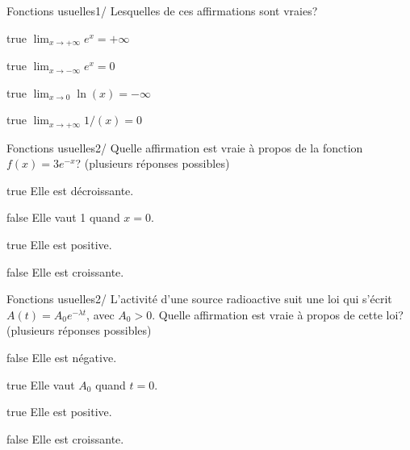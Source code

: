         	\begin{question}{30}{Fonctions usuelles}{1}{/}
				Lesquelles de ces affirmations sont vraies?
            \end{question}
            \begin{reponses}
            	\item[true] $\lim_{x\to +\infty} e^x = +\infty$
            	\item[true] $\lim_{x\to -\infty} e^x = 0$
                \item[true] $\lim_{x\to 0} \ln (x) = -\infty$
                \item[true] $\lim_{x\to +\infty} 1/(x) = 0$
            \end{reponses}
            \begin{question}{30}{Fonctions usuelles}{2}{/}
                Quelle affirmation est vraie à propos de la fonction $f(x)=3e^{-x}$? (plusieurs réponses possibles)
            \end{question}
            \begin{reponses}
                \item[true] Elle est décroissante.
                \item[false] Elle vaut 1 quand $x=0$.
                \item[true] Elle est positive.
                \item[false] Elle est croissante.
            \end{reponses}
            \begin{question}{30}{Fonctions usuelles}{2}{/}
                L'activité d'une source radioactive suit une loi qui s'écrit $A(t)=A_0 e^{-\lambda t}$, avec $A_0 > 0$. Quelle affirmation est vraie à propos de cette loi? (plusieurs réponses possibles)
            \end{question}
            \begin{reponses}
                \item[false] Elle est négative.
                \item[true] Elle vaut $A_0$ quand $t=0$.
                \item[true] Elle est positive.
                \item[false] Elle est croissante.
            \end{reponses}
